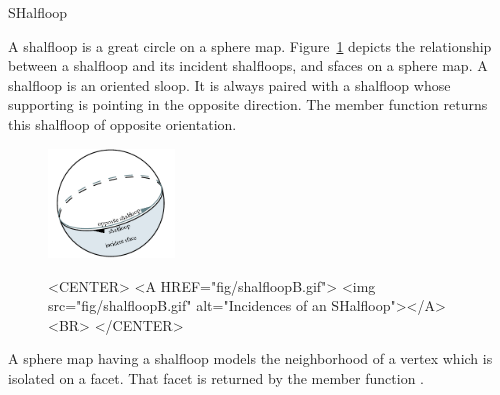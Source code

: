 
\ccRefPageBegin



\begin{ccRefClass}{SHalfloop}

\ccDefinition

A shalfloop is a great circle on a sphere map. 
Figure~\ref{figureNef3HalfloopIncidences}
depicts the relationship between a shalfloop and its incident
shalfloops, and sfaces on a sphere map.  A shalfloop is 
an oriented sloop. It is always paired with a 
shalfloop whose supporting  is pointing in
the opposite direction. The  member function returns
this shalfloop of opposite orientation.

    \begin{figure}[bht]
\begin{ccTexOnly}
        \begin{center}
          \parbox{0.3\textwidth}{%
              \includegraphics[width=0.3\textwidth]{Nef_3_ref/fig/shalfloopB}%
          }
        \end{center}
\end{ccTexOnly}

\begin{ccHtmlOnly}
    <CENTER>
    <A HREF="fig/shalfloopB.gif">
        <img src="fig/shalfloopB.gif" 
             alt="Incidences of an SHalfloop"></A><BR>
    </CENTER>
\end{ccHtmlOnly}
        \label{figureNef3HalfloopIncidences}
    \end{figure}

A sphere map having a shalfloop models the neighborhood of a vertex which is 
isolated on a facet. That facet is returned by the member function
. 


\end{ccRefClass}
